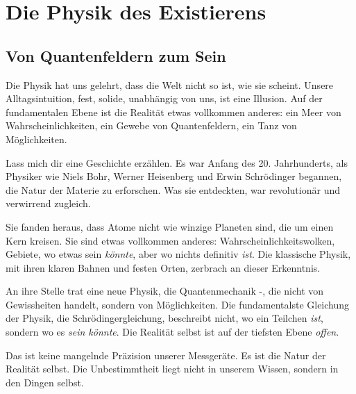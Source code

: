 
\chapter{Die Physik des Existierens}

\section{Von Quantenfeldern zum Sein}

Die Physik hat uns gelehrt, dass die Welt nicht so ist, wie sie scheint. Unsere Alltagsintuition, fest, solide, unabhängig von uns, ist eine Illusion. Auf der fundamentalen Ebene ist die Realität etwas vollkommen anderes: ein Meer von Wahrscheinlichkeiten, ein Gewebe von Quantenfeldern, ein Tanz von Möglichkeiten.

Lass mich dir eine Geschichte erzählen. Es war Anfang des 20. Jahrhunderts, als Physiker wie Niels Bohr, Werner Heisenberg und Erwin Schrödinger begannen, die Natur der Materie zu erforschen. Was sie entdeckten, war revolutionär und verwirrend zugleich.

Sie fanden heraus, dass Atome nicht wie winzige Planeten sind, die um einen Kern kreisen. Sie sind etwas vollkommen anderes: Wahrscheinlichkeitswolken, Gebiete, wo etwas sein \emph{könnte}, aber wo nichts definitiv \emph{ist}. Die klassische Physik, mit ihren klaren Bahnen und festen Orten, zerbrach an dieser Erkenntnis.

An ihre Stelle trat eine neue Physik, die Quantenmechanik -, die nicht von Gewissheiten handelt, sondern von Möglichkeiten. Die fundamentalste Gleichung der Physik, die Schrödingergleichung, beschreibt nicht, wo ein Teilchen \emph{ist}, sondern wo es \emph{sein könnte}. Die Realität selbst ist auf der tiefsten Ebene \emph{offen}.

Das ist keine mangelnde Präzision unserer Messgeräte. Es ist die Natur der Realität selbst. Die Unbestimmtheit liegt nicht in unserem Wissen, sondern in den Dingen selbst.

